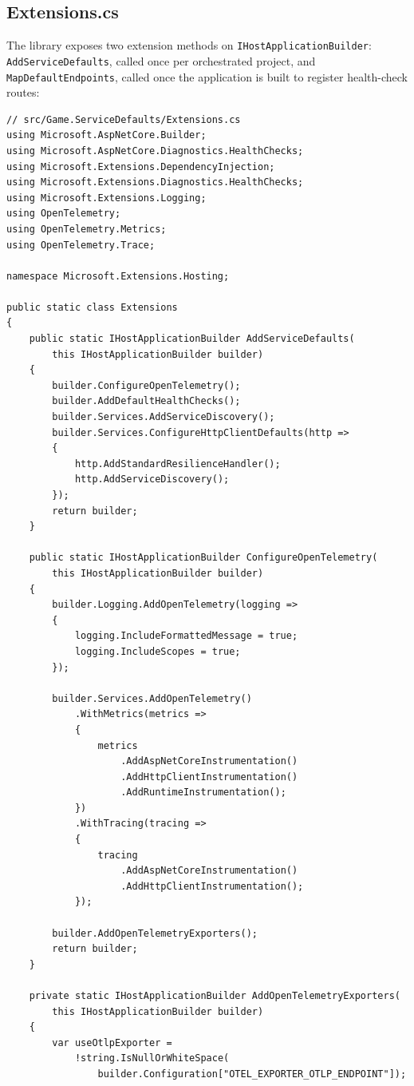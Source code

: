 \subsection{Extensions.cs}

The library exposes two extension methods on \texttt{IHostApplicationBuilder}: \texttt{AddServiceDefaults}, called once per orchestrated project, and \texttt{MapDefaultEndpoints}, called once the application is built to register health-check routes:

\begin{lstlisting}[language={[Sharp]C}]
// src/Game.ServiceDefaults/Extensions.cs
using Microsoft.AspNetCore.Builder;
using Microsoft.AspNetCore.Diagnostics.HealthChecks;
using Microsoft.Extensions.DependencyInjection;
using Microsoft.Extensions.Diagnostics.HealthChecks;
using Microsoft.Extensions.Logging;
using OpenTelemetry;
using OpenTelemetry.Metrics;
using OpenTelemetry.Trace;

namespace Microsoft.Extensions.Hosting;

public static class Extensions
{
    public static IHostApplicationBuilder AddServiceDefaults(
        this IHostApplicationBuilder builder)
    {
        builder.ConfigureOpenTelemetry();
        builder.AddDefaultHealthChecks();
        builder.Services.AddServiceDiscovery();
        builder.Services.ConfigureHttpClientDefaults(http =>
        {
            http.AddStandardResilienceHandler();
            http.AddServiceDiscovery();
        });
        return builder;
    }

    public static IHostApplicationBuilder ConfigureOpenTelemetry(
        this IHostApplicationBuilder builder)
    {
        builder.Logging.AddOpenTelemetry(logging =>
        {
            logging.IncludeFormattedMessage = true;
            logging.IncludeScopes = true;
        });

        builder.Services.AddOpenTelemetry()
            .WithMetrics(metrics =>
            {
                metrics
                    .AddAspNetCoreInstrumentation()
                    .AddHttpClientInstrumentation()
                    .AddRuntimeInstrumentation();
            })
            .WithTracing(tracing =>
            {
                tracing
                    .AddAspNetCoreInstrumentation()
                    .AddHttpClientInstrumentation();
            });

        builder.AddOpenTelemetryExporters();
        return builder;
    }

    private static IHostApplicationBuilder AddOpenTelemetryExporters(
        this IHostApplicationBuilder builder)
    {
        var useOtlpExporter =
            !string.IsNullOrWhiteSpace(
                builder.Configuration["OTEL_EXPORTER_OTLP_ENDPOINT"]);


\end{lstlisting}
